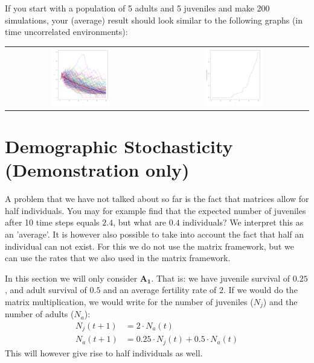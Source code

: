 \documentclass{article}\usepackage[]{graphicx}\usepackage[]{color}
\begin{document}
If you start with a population of 5 adults and 5 juveniles and make 200 simulations, your (average) result should look similar to the following graphs (in time uncorrelated environments):
\begin{center}
\begin{tabular}{c c}

\includegraphics[width=0.40\textwidth]{figure/simop-1} 
 & 
\includegraphics[width=0.40\textwidth]{figure/simop-2} 

\end{tabular}
\end{center}
\section{Demographic Stochasticity (Demonstration only)}
A problem that we have not talked about so far is the fact that matrices allow for half individuals. You may for example find that the expected number of juveniles after 10 time steps equals $2.4$, but what are $0.4$ individuals? We interpret this as an 'average'. It is however also possible to take into account the fact that half an individual can not exist. For this we do not use the matrix framework, but we can use the rates that we also used in the matrix framework.

In this section we will only consider $\boldsymbol{A_1}$. That is: we have juvenile survival of $0.25$, and adult survival of $0.5$ and an average fertility rate of $2$. If we would do the matrix multiplication, we would write for the number of juveniles ($N_j$) and the number of adults ($N_a$):
\begin{align*}
N_j(t+1) &= 2\cdot N_a (t)\\
N_a(t+1) &= 0.25\cdot N_j(t) + 0.5\cdot N_a(t)
\end{align*}
This will however give rise to half individuals as well.
\end{document}
